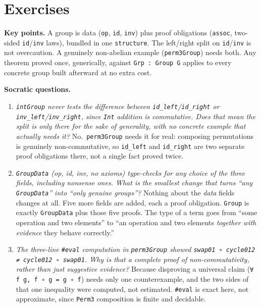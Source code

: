 \section{Exercises}\label{sec:06-groups:07-exercises:1}

\textbf{Key points.} A group is data (\texttt{op}, \texttt{id}, \texttt{inv}) plus proof obligations (\texttt{assoc}, two-sided \texttt{id}/\texttt{inv} laws), bundled in one \texttt{structure}. The left/right split on \texttt{id}/\texttt{inv} is not overcaution. A genuinely non-abelian example (\texttt{perm3Group}) needs both. Any theorem proved once, generically, against \texttt{Grp : Group G} applies to every concrete group built afterward at no extra cost.

\textbf{Socratic questions.}

\begin{enumerate}
\def\labelenumi{\arabic{enumi}.}
\item
  \emph{\texttt{intGroup} never tests the difference between \texttt{id\_\allowbreak{}left}/\texttt{id\_\allowbreak{}right} or \texttt{inv\_\allowbreak{}left}/\texttt{inv\_\allowbreak{}right}, since \texttt{Int} addition is commutative. Does that mean the split is only there for the sake of generality, with no concrete example that actually needs it?} No.~\texttt{perm3Group} needs it for real: composing permutations is genuinely non-commutative, so \texttt{id\_\allowbreak{}left} and \texttt{id\_\allowbreak{}right} are two separate proof obligations there, not a single fact proved twice.
\item
  \emph{\texttt{GroupData} (op, id, inv, no axioms) type-checks for any choice of the three fields, including nonsense ones. What is the smallest change that turns ``any \texttt{GroupData}'' into ``only genuine groups''?} Nothing about the \emph{data} fields changes at all. Five more fields are added, each a proof obligation. \texttt{Group} is exactly \texttt{GroupData} plus those five proofs. The type of a term goes from ``some operation and two elements'' to ``an operation and two elements \emph{together with evidence} they behave correctly.''
\item
  \emph{The three-line \texttt{\#eval} computation in \texttt{perm3Group} showed \texttt{swap01 ∘ cycle012 ≠ cycle012 ∘ swap01}. Why is that a complete proof of non-commutativity, rather than just suggestive evidence?} Because disproving a universal claim (\texttt{∀ f g, f ∘ g = g ∘ f}) needs only one counterexample, and the two sides of that one inequality were computed, not estimated. \texttt{\#eval} is exact here, not approximate, since \texttt{Perm3} composition is finite and decidable.

\end{enumerate}

